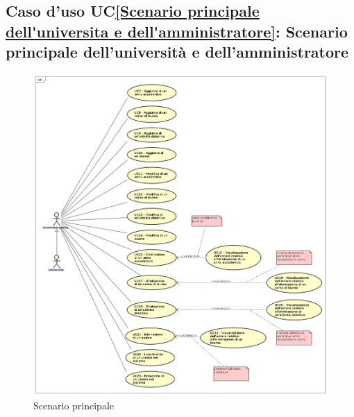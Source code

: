 \subsection{Caso d'uso UC\ref{Scenario principale dell'universita e dell'amministratore}: Scenario principale dell'università e dell'amministratore}
\begin{figure} [H]
	\centering
	\includegraphics[scale=0.4]{./img/UseCaseDiagram02.png}
	\caption{Scenario principale }\label{}
\end{figure}
